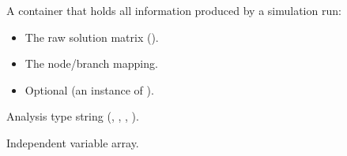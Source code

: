 \documentclass[letterpaper,10pt,english]{sphinxmanual}
\begin{document}
\begin{fulllineitems}
\label{\detokenize{results:SimulationResult}}
\pysigstartsignatures
\pysiglinewithargsret
{}
{\sphinxparamcomma {}\sphinxparamcomma {}\sphinxparamcomma {}}
{}
\pysigstopsignatures
\sphinxAtStartPar
A container that holds all information produced by a simulation run:
\begin{itemize}
\item {} 
\sphinxAtStartPar
The raw solution matrix ().

\item {} 
\sphinxAtStartPar
The node/branch mapping.

\item {} 
\sphinxAtStartPar
Optional {\hyperref[\detokenize{results:SimulationResult.sensitivities}]{}} (an instance of {\hyperref[\detokenize{results:SensitivityData}]{}}).

\end{itemize}

\begin{fulllineitems}
\label{\detokenize{results:SimulationResult.type}}
\pysigstartsignatures
\pysigline
{}
\pysigstopsignatures
\sphinxAtStartPar
Analysis type string (, , , ).

\end{fulllineitems}


\begin{fulllineitems}
\label{\detokenize{results:SimulationResult.sweep_axis}}
\pysigstartsignatures
\pysigline
{}
\pysigstopsignatures
\sphinxAtStartPar
Independent variable array.

\end{fulllineitems}



\end{fulllineitems}
\end{document}

